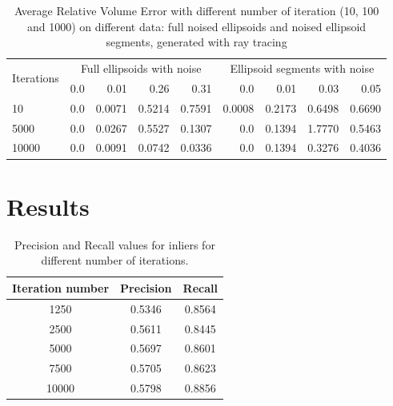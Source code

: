 \begin{table}[!htb]
  \centering
  \begin{tabular}{lrrrrrrrr}
  \toprule
  \multirow{2}{*}{Iterations} & \multicolumn{4}{c}{Full ellipsoids with noise} & \multicolumn{4}{c}{Ellipsoid segments with noise} \\
  \cmidrule(lr){2-5} \cmidrule(lr){6-9}
    & 0.0 & 0.01 & 0.26 & 0.31 & 0.0 & 0.01 & 0.03 & 0.05 \\
  \midrule
  10 & 0.0 & 0.0071 & 0.5214 & 0.7591 & 0.0008 & 0.2173 & 0.6498 & 0.6690 \\
  5000 & 0.0 & 0.0267 & 0.5527 & 0.1307 & 0.0 & 0.1394 & 1.7770 & 0.5463 \\
  10000 & 0.0 & 0.0091 & 0.0742 & 0.0336 & 0.0 & 0.1394 & 0.3276 & 0.4036 \\
  \bottomrule
  \end{tabular}
  \caption{Average Relative Volume Error with different number of iteration (10, 100 and 1000) on different data: full noised ellipsoids and noised ellipsoid segments, generated with ray tracing}
  \label{tab:vol_table}
  \end{table}

\section{Results}
\label{sec_results}

\begin{table}[h]
  \centering
  \begin{tabular}{|c|c|c|}
      \hline
      \textbf{Iteration number} & \textbf{Precision} & \textbf{Recall} \\
      \hline
      1250  & 0.5346 & 0.8564 \\
      2500  & 0.5611 & 0.8445 \\
      5000  & 0.5697 & 0.8601 \\
      7500  & 0.5705 & 0.8623 \\
      10000 & 0.5798 & 0.8856 \\
      \hline
  \end{tabular}
  \caption{Precision and Recall values for inliers for different number of iterations.}
  \label{tab:precision_recall}
\end{table}


